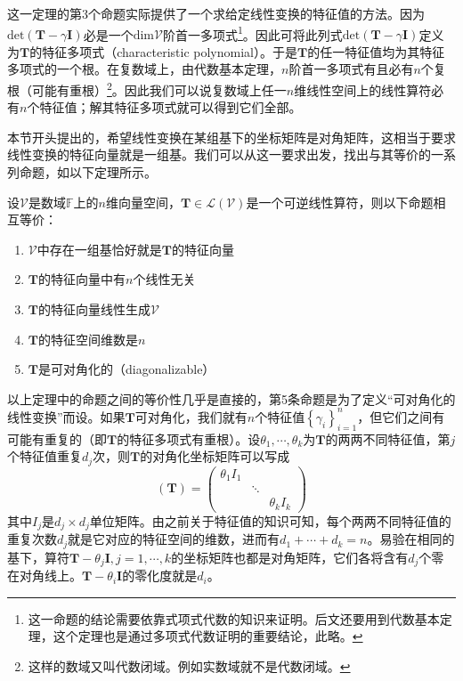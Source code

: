 \documentclass[main.tex]{subfiles}
\begin{document}
这一定理的第3个命题实际提供了一个求给定线性变换的特征值的方法。因为$\mathrm{det}\left(\mathbf{T}-\gamma\mathbf{I}\right)$必是一个$\mathrm{dim}\mathcal{V}$阶首一多项式\footnote{这一命题的结论需要依靠式项式代数的知识来证明。后文还要用到代数基本定理，这个定理也是通过多项式代数证明的重要结论，此略。}。因此可将此列式$\mathrm{det}\left(\mathbf{T}-\gamma\mathbf{I}\right)$定义为$\mathbf{T}$的特征多项式（characteristic polynomial）。于是$\mathbf{T}$的任一特征值均为其特征多项式的一个根。在复数域上，由代数基本定理，$n$阶首一多项式有且必有$n$个复根（可能有重根）\footnote{这样的数域又叫代数闭域。例如实数域就不是代数闭域。}。因此我们可以说复数域上任一$n$维线性空间上的线性算符必有$n$个特征值；解其特征多项式就可以得到它们全部。

本节开头提出的，希望线性变换在某组基下的坐标矩阵是对角矩阵，这相当于要求线性变换的特征向量就是一组基。我们可以从这一要求出发，找出与其等价的一系列命题，如以下定理所示。

\begin{theorem}
设$\mathcal{V}$是数域$\mathbb{F}$上的$n$维向量空间，$\mathbf{T}\in\mathcal{L}\left(\mathcal{V}\right)$是一个可逆线性算符，则以下命题相互等价：
\begin{enumerate}
    \item $\mathcal{V}$中存在一组基恰好就是$\mathbf{T}$的特征向量
    \item $\mathbf{T}$的特征向量中有$n$个线性无关
    \item $\mathbf{T}$的特征向量线性生成$\mathcal{V}$
    \item $\mathbf{T}$的特征空间维数是$n$
    \item $\mathbf{T}$是可对角化的（diagonalizable）
\end{enumerate}
\end{theorem}

以上定理中的命题之间的等价性几乎是直接的\cite[\S5.2“矩阵可对角化的条件”,p.123]{周胜林2012线性代数}，第5条命题是为了定义“可对角化的线性变换”而设。如果$\mathbf{T}$可对角化，我们就有$n$个特征值$\left\{\gamma_i\right\}_{i=1}^n$，但它们之间有可能有重复的（即$\mathbf{T}$的特征多项式有重根）。设$\theta_1,\cdots,\theta_k$为$\mathbf{T}$的两两不同特征值，第$j$个特征值重复$d_j$次，则$\mathbf{T}$的对角化坐标矩阵可以写成
\[\left(\mathbf{T}\right)=\left(\begin{array}{ccc}\theta_1I_1&&\\&\ddots&\\&&\theta_kI_k\end{array}\right)\]
其中$I_j$是$d_j\times d_j$单位矩阵。由之前关于特征值的知识可知，每个两两不同特征值的重复次数$d_j$就是它对应的特征空间的维数，进而有$d_1+\cdots+d_k=n$。易验在相同的基下，算符$\mathbf{T}-\theta_j\mathbf{I},j=1,\cdots,k$的坐标矩阵也都是对角矩阵，它们各将含有$d_j$个零在对角线上。$\mathbf{T}-\theta_i\mathbf{I}$的零化度就是$d_i$。
\end{document}
